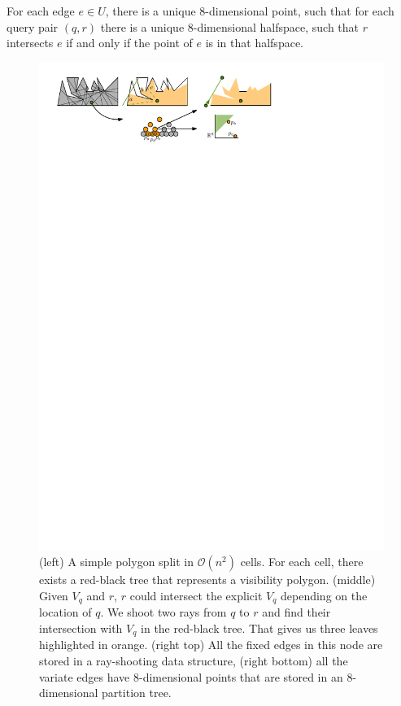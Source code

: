 \documentclass[UKenglish]{lipics-v2019}
\begin{document}
\begin{lemma}
\label{lemma:uncertain_intersection}
For each edge $e \in U$, there is a unique 8-dimensional point, such that for each query pair $(q, r)$ there is a unique $8$-dimensional halfspace, such that $r$ intersects $e$ if and only if the point of $e$ is in that halfspace.
\end{lemma}

\begin{figure}[h]
    \centering
    \includegraphics[]{../twolevel}
    \caption{ (left) A simple polygon split in $\mathcal{O}(n^2)$ cells. For each cell, there exists a red-black tree that represents a visibility polygon. (middle) Given $V_q$ and $r$, $r$ could intersect the explicit $V_q$ depending on the location of $q$. We shoot two rays from $q$ to $r$ and find their intersection with $V_q$ in the red-black tree. That gives us three leaves highlighted in orange. (right top) All the fixed edges in this node are stored in a ray-shooting data structure, (right bottom) all the variate edges have 8-dimensional points that are stored in an $8$-dimensional partition tree.}
    \label{fig:twolevel}
\end{figure}
\end{document}
